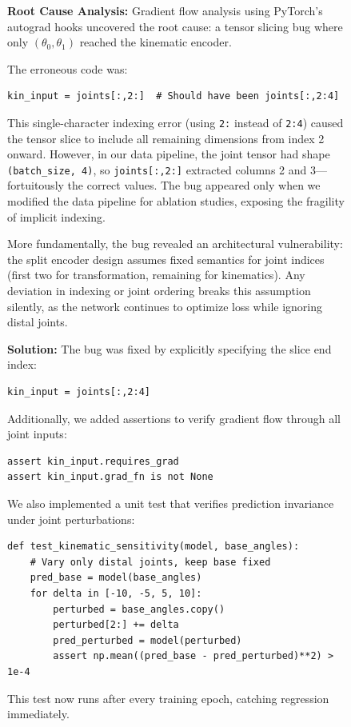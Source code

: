 \documentclass[12pt,a4paper,oneside]{report}
\begin{document}
\begin{figure}[H]
\textbf{Root Cause Analysis:} Gradient flow analysis using PyTorch's autograd hooks uncovered the root cause: a tensor slicing bug where only $(\theta_0, \theta_1)$ reached the kinematic encoder.

The erroneous code was:
\begin{verbatim}
kin_input = joints[:,2:]  # Should have been joints[:,2:4]
\end{verbatim}

This single-character indexing error (using \texttt{2:} instead of \texttt{2:4}) caused the tensor slice to include all remaining dimensions from index 2 onward. However, in our data pipeline, the joint tensor had shape \texttt{(batch\_size, 4)}, so \texttt{joints[:,2:]} extracted columns 2 and 3---fortuitously the correct values. The bug appeared only when we modified the data pipeline for ablation studies, exposing the fragility of implicit indexing.

More fundamentally, the bug revealed an architectural vulnerability: the split encoder design assumes fixed semantics for joint indices (first two for transformation, remaining for kinematics). Any deviation in indexing or joint ordering breaks this assumption silently, as the network continues to optimize loss while ignoring distal joints.

\textbf{Solution:} The bug was fixed by explicitly specifying the slice end index:
\begin{verbatim}
kin_input = joints[:,2:4]
\end{verbatim}

Additionally, we added assertions to verify gradient flow through all joint inputs:
\begin{verbatim}
assert kin_input.requires_grad
assert kin_input.grad_fn is not None
\end{verbatim}

We also implemented a unit test that verifies prediction invariance under joint perturbations:

\begin{verbatim}
def test_kinematic_sensitivity(model, base_angles):
    # Vary only distal joints, keep base fixed
    pred_base = model(base_angles)
    for delta in [-10, -5, 5, 10]:
        perturbed = base_angles.copy()
        perturbed[2:] += delta
        pred_perturbed = model(perturbed)
        assert np.mean((pred_base - pred_perturbed)**2) > 1e-4
\end{verbatim}

This test now runs after every training epoch, catching regression immediately.


\end{figure}
\end{document}
